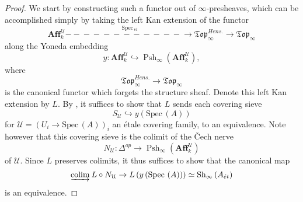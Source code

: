 \documentclass[12pt]{amsart}
\theoremstyle{definition}
\newcommand{\cU}{\mathcal{U}}
\newcommand{\Affku}{\mathbf{Aff}^{\cU}_{k}}
\newcommand{\Topi}{\mathfrak{Top}_\i}
\newcommand{\Spec}{\mathrm{Spec}\,}
\newcommand{\Sh}{\operatorname{Sh}}
\newcommand{\et}{\acute{e}t}
\renewcommand{\i}{\infty}
\def\Pshi{\operatorname{Psh}_\i}
\def\Shi{\Sh_\i}
\def\colim{\underrightarrow{\mbox{colim}\vspace{0.5pt}}\mspace{4mu}}
\def\Htop{\Topi^{\mathit{Hens.}}}
\def\longlongrightarrow{-\!\!\!-\!\!\!-\!\!\!-\!\!\!-\!\!\!-\!\!\!\longrightarrow}
\def\longlonglongrightarrow{-\!\!\!-\!\!\!-\!\!\!-\!\!\!-\!\!\!-\!\!\!\longlongrightarrow}
\begin{document}
\begin{proof}
We start by constructing such a functor out of $\i$-presheaves, which can be accomplished simply by taking the left Kan extension of the functor $$\Affku \stackrel{\Spec_{\et}}{\longlonglongrightarrow} \Htop \to \mathfrak{Top}_\i$$ along the Yoneda embedding $$y:\Affku \hookrightarrow \Pshi\left(\Affku\right),$$ where $$\Htop \to \mathfrak{Top}_\i$$ is the canonical functor which forgets the structure sheaf. Denote this left Kan extension by $L.$ By \cite[Proposition 5.5.4.20 and Theorem 5.1.5.6]{htt}, it suffices to show that $L$ sends each covering sieve $$S_\mathcal{U} \hookrightarrow y\left(\Spec\left(A\right)\right)$$ for $\mathcal{U}=\left(U_i \to \Spec\left(A\right)\right)_i$ an \'etale covering family, to an equivalence. Note however that this covering sieve is the colimit of the \v{C}ech nerve $$N_\mathcal{U}:\Delta^{op} \to \Pshi\left(\Affku\right)$$ of $\mathcal{U}.$ Since $L$ preserves colimits, it thus suffices to show that the canonical map $$\colim L\circ N_{\mathcal{U}} \to L\left(y\left(\Spec\left(A\right)\right)\right)\simeq \Shi\left(A_{\et}\right)$$ is an equivalence. 


\end{proof}
\end{document}
